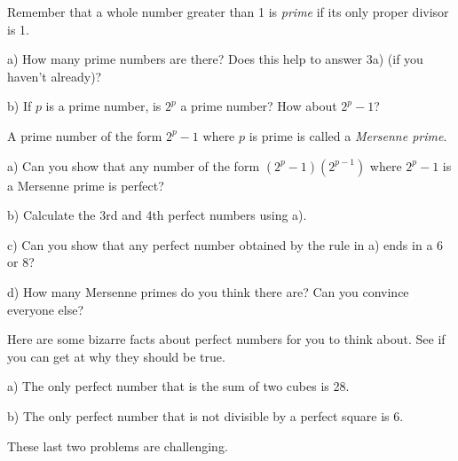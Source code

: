 \documentclass[12pt]{article}
\newcommand{\numb}[1]{\noindent{\bf #1)}}
\begin{document}
\newpage


\numb{4} Remember that a whole number greater than 1 is \textit{prime} if its only proper divisor is 1. 

\bigskip

a) How many prime numbers are there? Does this help to answer 3a) (if you haven't already)?

\bigskip

b) If $p$ is a prime number, is $2^p$ a prime number? How about $2^p-1$?

\newpage


\numb{5} A prime number of the form $2^p-1$ where $p$ is prime is called a \textit{Mersenne prime}.

\bigskip

a) Can you show that any number of the form $(2^p-1)(2^{p-1})$ where $2^p-1$ is a Mersenne prime is perfect?

\bigskip

b) Calculate the 3rd and 4th perfect numbers using a).

\bigskip

c) Can you show that any perfect number obtained by the rule in a) ends in a 6 or 8?

\bigskip

d) How many Mersenne primes do you think there are? Can you convince everyone else?

\newpage


\numb{6} Here are some bizarre facts about perfect numbers for you to think about. See if you can get at why they should be true. 

\bigskip

a) The only perfect number that is the sum of two cubes is 28.

\bigskip

b) The only perfect number that is not divisible by a perfect square is 6. 


\newpage

\numb{7} These last two problems are challenging.

\end{document}
